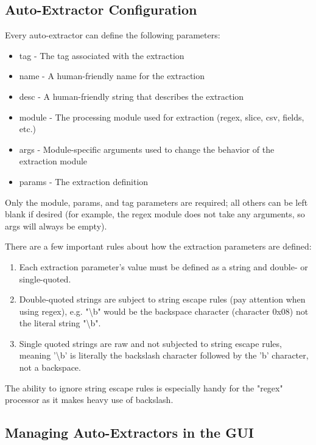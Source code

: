 \subsection{Auto-Extractor Configuration}

Every auto-extractor can define the following parameters:

\begin{itemize}
\item
  tag - The tag associated with the extraction
\item
  name - A human-friendly name for the extraction
\item
  desc - A human-friendly string that describes the extraction
\item
  module - The processing module used for extraction (regex, slice,
  csv, fields, etc.)
\item
  args - Module-specific arguments used to change the behavior of the
  extraction module
\item
  params - The extraction definition
\end{itemize}

Only the module, params, and tag parameters are required;
all others can be left blank if desired (for example, the regex module
does not take any arguments, so args will always be empty).

There are a few important rules about how the extraction parameters are
defined:

\begin{enumerate}
\tightlist
\item
  Each extraction parameter's value must be defined as a string and
  double- or single-quoted.
\item
  Double-quoted strings are subject to string escape rules (pay
  attention when using regex), e.g. "\textbackslash{}b" would be the backspace character (character 0x08)
  not the literal string "\textbackslash{}b".
\item
  Single quoted strings are raw and not subjected to string escape
  rules, meaning '\textbackslash{}b' is literally the backslash character followed
  by the 'b' character, not a backspace.
\end{enumerate}

The ability to ignore string escape rules is especially handy for the
"regex" processor as it makes heavy use of backslash.

\subsection{Managing Auto-Extractors in the GUI}


